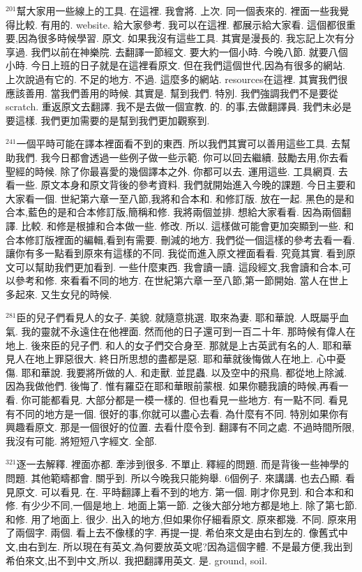 \documentclass{book}
\begin{document}
$^{201}$幫大家用一些線上的工具.
在這裡.
我會將.
上次.
同一個表來的.
裡面一些我覺得比較.
有用的.
website.
給大家參考.
我可以在這裡.
都展示給大家看.
這個都很重要,因為很多時候學習.
原文.
如果我沒有這些工具.
其實是漫長的.
我忘記上次有分享過.
我們以前在神樂院.
去翻譯一節經文.
要大約一個小時.
今晚八節.
就要八個小時.
今日上班的日子就是在這裡看原文.
但在我們這個世代,因為有很多的網站.
上次說過有它的.
不足的地方.
不過.
這麼多的網站.
resources在這裡.
其實我們很應該善用.
當我們善用的時候.
其實是.
幫到我們.
特別.
我們強調我們不是要從 scratch.
重返原文去翻譯.
我不是去做一個宣教.
的.
的事,去做翻譯員.
我們未必是要這樣.
我們更加需要的是幫到我們更加觀察到.

$^{241}$一個平時可能在譯本裡面看不到的東西.
所以我們其實可以善用這些工具.
去幫助我們.
我今日都會透過一些例子做一些示範.
你可以回去繼續.
鼓勵去用,你去看聖經的時候.
除了你最喜愛的幾個譯本之外.
你都可以去.
運用這些.
工具網頁.
去看一些.
原文本身和原文背後的參考資料.
我們就開始進入今晚的課題.
今日主要和大家看一個.
世紀第六章一至八節,我將和合本和.
和修訂版.
放在一起.
黑色的是和合本,藍色的是和合本修訂版,簡稱和修.
我將兩個並排.
想給大家看看.
因為兩個翻譯.
比較.
和修是根據和合本做一些.
修改.
所以.
這樣做可能會更加突顯到一些.
和合本修訂版裡面的編輯,看到有需要.
刪減的地方.
我們從一個這樣的參考去看一看.
讓你有多一點看到原來有這樣的不同.
我從而進入原文裡面看看.
究竟其實.
看到原文可以幫助我們更加看到.
一些什麼東西.
我會讀一讀.
這段經文,我會讀和合本,可以參考和修.
來看看不同的地方.
在世紀第六章一至八節,第一節開始.
當人在世上多起來.
又生女兒的時候.

$^{281}$臣的兒子們看見人的女子.
美貌.
就隨意挑選.
取來為妻.
耶和華說.
人既屬乎血氣.
我的靈就不永遠住在他裡面.
然而他的日子還可到一百二十年.
那時候有偉人在地上.
後來臣的兒子們.
和人的女子們交合身至.
那就是上古英武有名的人.
耶和華見人在地上罪惡很大.
終日所思想的盡都是惡.
耶和華就後悔做人在地上.
心中憂傷.
耶和華說.
我要將所做的人.
和走獸.
並昆蟲.
以及空中的飛鳥.
都從地上除滅.
因為我做他們.
後悔了.
惟有羅亞在耶和華眼前蒙根.
如果你聽我讀的時候,再看一看.
你可能都看見.
大部分都是一模一樣的.
但也看見一些地方.
有一點不同.
看見有不同的地方是一個.
很好的事,你就可以盡心去看.
為什麼有不同.
特別如果你有興趣看原文.
那是一個很好的位置.
去看什麼令到.
翻譯有不同之處.
不過時間所限,我沒有可能.
將短短八字經文.
全部.

$^{321}$逐一去解釋.
裡面亦都.
牽涉到很多.
不單止.
釋經的問題.
而是背後一些神學的問題.
其他範疇都會.
關乎到.
所以今晚我只能夠舉.
6個例子.
來講講.
也去凸顯.
看見原文.
可以看見.
在.
平時翻譯上看不到的地方.
第一個.
剛才你見到.
和合本和和修.
有少少不同,一個是地上.
地面上第一節.
之後大部分地方都是地上.
除了第七節.
和修.
用了地面上.
很少.
出入的地方,但如果你仔細看原文.
原來都幾.
不同.
原來用了兩個字.
兩個.
看上去不像樣的字.
再提一提.
希伯來文是由右到左的.
像舊式中文,由右到左.
所以現在有英文,為何要放英文呢?因為這個字體.
不是最方便,我出到希伯來文,出不到中文,所以.
我把翻譯用英文.
是.
ground, soil.
\end{document}
